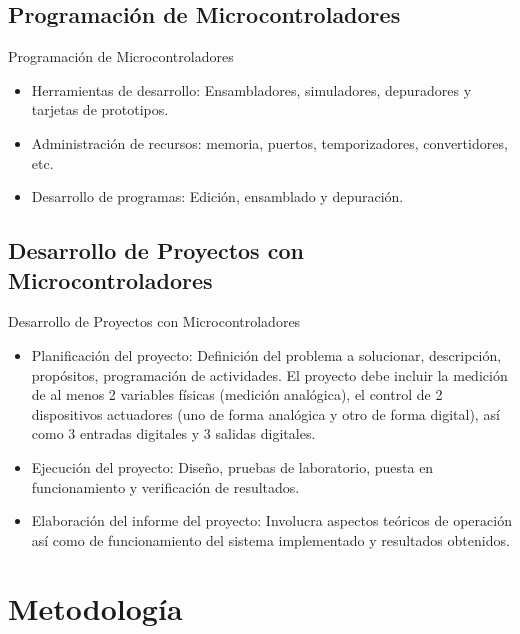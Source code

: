 \documentclass[xcolor=dvipsnames,handout]{beamer}
\begin{document}
\subsection[Programación]{Programación de Microcontroladores}

\begin{frame}{Programación de Microcontroladores}
\begin{block}{}
\begin{itemize}
 \item Herramientas de desarrollo: Ensambladores, simuladores, depuradores y tarjetas de prototipos.
 \item Administración de recursos: memoria, puertos, temporizadores, convertidores, etc.
 \item Desarrollo de programas: Edición, ensamblado y depuración.
\end{itemize}
\end{block}
\end{frame}

\subsection[Proyectos]{Desarrollo de Proyectos con Microcontroladores}

\begin{frame}{Desarrollo de Proyectos con Microcontroladores}
\begin{block}{}
\begin{itemize}
 \item Planificación del proyecto: Definición del problema a solucionar, descripción, propósitos, programación de actividades. El proyecto debe incluir la medición de al menos 2 variables físicas (medición analógica), el control de 2 dispositivos actuadores (uno de forma analógica y otro de forma digital), así como 3 entradas digitales y 3 salidas digitales.
 \item Ejecución del proyecto: Diseño, pruebas de laboratorio, puesta en funcionamiento y verificación de resultados.
 \item Elaboración del informe del proyecto: Involucra aspectos teóricos de operación así como de funcionamiento del sistema implementado y resultados obtenidos.
\end{itemize}
\end{block}
\end{frame}

\section{Metodología}
\end{document}
